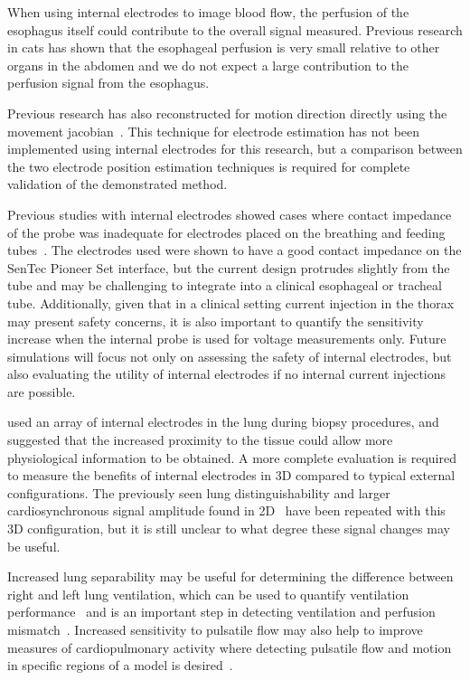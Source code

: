 When using internal electrodes to image blood flow, the perfusion of the esophagus itself could
contribute to the overall signal measured. Previous research in cats has shown that the esophageal 
perfusion is very small relative to other organs in the abdomen \parencite{hollwarth_esophageal_1986}
and we do not expect a large contribution to the perfusion signal from the esophagus.

Previous research has also 
reconstructed for motion direction directly using the movement
jacobian~\parencite{boyle_geophysical_2016,gomez-laberge_direct_2008,soleimani_imaging_2006}.
This technique for electrode estimation has not been implemented using internal electrodes 
for this research, but a comparison between the two electrode position estimation techniques 
is required for complete validation of the demonstrated method.

Previous studies with internal electrodes showed cases where contact impedance of the probe
was inadequate for electrodes
placed on the breathing and feeding tubes~\parencite{czaplik_application_2014}.
The electrodes used were shown to have a good contact impedance on the SenTec Pioneer
Set interface, but the current design protrudes slightly from the tube and may be challenging to 
integrate into a clinical esophageal or tracheal tube. Additionally, given that in a clinical setting 
current injection in the thorax may present safety concerns, it is also important to quantify the 
sensitivity increase when the internal probe is used for voltage measurements only. Future 
simulations will focus not only on assessing the safety of internal electrodes, 
but also evaluating the utility of internal electrodes if no internal current injections are possible.

 used an array of internal electrodes in the lung 
during biopsy procedures, and suggested that the increased proximity to the 
tissue could allow more physiological information to be obtained. A more complete 
evaluation is required to measure the benefits of internal electrodes in 3D compared 
to typical external configurations. The previously seen lung distinguishability
and larger cardiosynchronous signal amplitude found in 2D~\parencite{czaplik_application_2014} 
have been repeated with this 3D configuration, but it is still unclear to what 
degree these signal changes may be useful. 

Increased lung separability may be useful for determining the difference between right 
and left lung ventilation, which can be used to quantify ventilation 
performance~\parencite{sage_assessing_2018}
and is an important step in detecting ventilation and perfusion
mismatch~\parencite{stowe_comparison_2019,kircher_regional_2021,leonhardt_electrical_2012}.
Increased sensitivity to pulsatile flow may also help to improve measures
of cardiopulmonary activity where detecting pulsatile flow 
and motion in specific regions of a model is 
desired~\parencite{braun_accuracy_2018,proenca_non-invasive_2020}.


